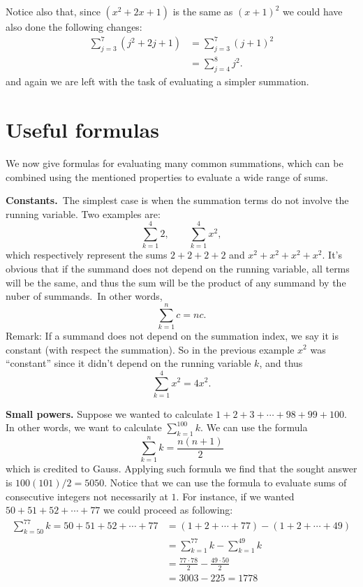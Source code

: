 \documentclass[12pt]{article}
\begin{document}
Notice also that, since $(x^2 + 2x + 1)$ is the same as $(x+1)^2$ we could have also done the following changes:
\begin{align*}
\sum_{j=3}^7(j^2+2j+1) &=\sum_{j=3}^7 (j+1)^2 \\
&=\sum_{j=4}^8 j^2.
\end{align*}
and again we are left with the task of evaluating a simpler summation.

\section*{Useful formulas}
We now give formulas for evaluating many common summations, which can be combined using the mentioned properties to evaluate a wide range of sums.

\medskip\textbf{Constants.}\, The simplest case is when the summation terms do not involve the running variable. Two examples are:
\[\sum_{k=1}^4 2, \qquad\sum_{k=1}^4 x^2,\]
which respectively represent the sums $2+2+2+2$ and $x^2 + x^2 + x^2 + x^2$. It's obvious that if the summand does not depend on the running variable, all terms will be the same, and thus the sum will be the product of any summand by the nuber of summands.\, In other words,
\[
\sum_{k=1}^n c = nc.
\]
Remark: If a summand does not depend on the summation index, we say it is constant (with respect the summation). So in the previous example $x^2$ was ``constant'' since it didn't depend on the running variable $k$, and thus 
\[\sum_{k=1}^4 x^2 = 4x^2.\] 

\medskip\textbf{Small powers.}
Suppose we wanted to calculate $1+2+3+\cdots+98+99+100$. In other words, we want to calculate $\sum_{k=1}^{100} k$. We can use the formula
\[\sum_{k=1}^n k = \frac{n(n+1)}{2}
\]
which is credited to Gauss. Applying such formula we find that the sought answer is $100(101)/2 = 5050$.
Notice that we can use the formula to evaluate sums of consecutive integers not necessarily at $1$. For instance, if we wanted
$50 + 51 + 52+\cdots+77$ we could proceed as following:
\begin{align*}
\sum_{k=50}^{77} k = 50 + 51 + 52+\cdots+77 &= (1 + 2 + \cdots + 77 ) - (1+2+\cdots + 49)\\
 &=\sum_{k=1}^{77} k - \sum_{k=1}^{49} k\\
 &=\frac{77\cdot 78}{2}-\frac{49\cdot 50}{2}\\
 &=3003-225=1778
\end{align*}
\end{document}
